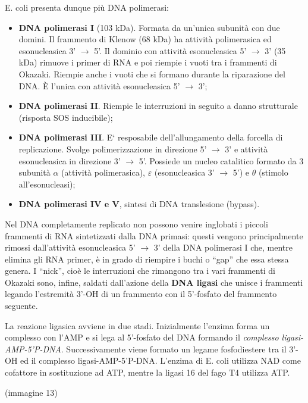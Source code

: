 \documentclass[11pt]{book}
\begin{document}
E. coli presenta dunque più DNA polimerasi:

\begin{itemize}
\itemsep1pt\parskip0pt
\item
  \textbf{DNA polimerasi I} (103 kDa). Formata da un'unica subunità con
  due domini. Il frammento di Klenow (68 kDa) ha attività polimerasica
  ed esonucleasica 3' \(\rightarrow\) 5'. Il dominio con attività
  esonucleasica 5' \(\rightarrow\) 3' (35 kDa) rimuove i primer di RNA e
  poi riempie i vuoti tra i frammenti di Okazaki. Riempie anche i vuoti
  che si formano durante la riparazione del DNA. È l'unica con attività
  esonucleasica 5' \(\rightarrow\) 3';
\item
  \textbf{DNA polimerasi II}. Riempie le interruzioni in seguito a danno
  strutturale (risposta SOS inducibile);
\item
  \textbf{DNA polimerasi III}. E` resposabile dell'allungamento della
  forcella di replicazione. Svolge polimerizzazione in direzione 5'
  \(\rightarrow\) 3' e attività esonucleasica in direzione 3'
  \(\rightarrow\) 5'. Possiede un nucleo catalitico formato da 3
  subunità \(\alpha\) (attività polimerasica), \(\varepsilon\)
  (esonucleasica 3' \(\rightarrow\) 5') e \(\theta\) (stimolo
  all'esonucleasi);
\item
  \textbf{DNA polimerasi IV e V}, sintesi di DNA translesione (bypass).
\end{itemize}

Nel DNA completamente replicato non possono venire inglobati i piccoli
frammenti di RNA sintetizzati dalla DNA primasi: questi vengono
principalmente rimossi dall'attività esonucleasica 5' \(\rightarrow\) 3'
della DNA polimerasi I che, mentre elimina gli RNA primer, è in grado di
riempire i buchi o ``gap'' che essa stessa genera. I ``nick'', cioè le
interruzioni che rimangono tra i vari frammenti di Okazaki sono, infine,
saldati dall'azione della \textbf{DNA ligasi} che unisce i frammenti
legando l'estremità 3'-OH di un frammento con il 5'-fosfato del
frammento seguente.

La reazione ligasica avviene in due stadi. Inizialmente l'enzima forma
un complesso con l'AMP e si lega al 5'-fosfato del DNA formando il
\emph{complesso ligasi-AMP-5'P-DNA}. Successivamente viene formato un
legame fosfodiestere tra il 3'-OH ed il complesso ligasi-AMP-5'P-DNA.
L'enzima di E. coli utilizza NAD come cofattore in sostituzione ad ATP,
mentre la ligasi 16 del fago T4 utilizza ATP.

(immagine 13)
\end{document}
